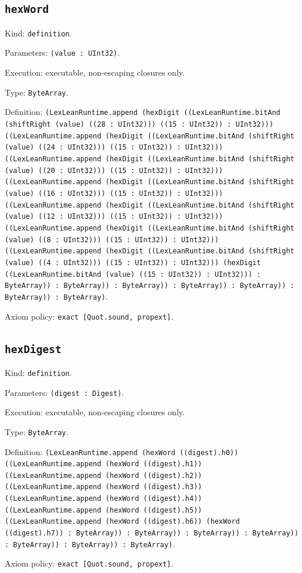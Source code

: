 \documentclass[11pt]{article}
\begin{document}
\subsection*{\texttt{hexWord}}
\noindent Kind: \texttt{definition}.\par
\noindent Parameters: \texttt{(value : UInt32)}.\par
\noindent Execution: executable, non-escaping closures only.\par
\noindent Type: \texttt{ByteArray}.\par
\noindent Definition: \texttt{(LexLeanRuntime.append (hexDigit ((LexLeanRuntime.bitAnd (shiftRight (value) ((28 : UInt32))) ((15 : UInt32)) : UInt32))) ((LexLeanRuntime.append (hexDigit ((LexLeanRuntime.bitAnd (shiftRight (value) ((24 : UInt32))) ((15 : UInt32)) : UInt32))) ((LexLeanRuntime.append (hexDigit ((LexLeanRuntime.bitAnd (shiftRight (value) ((20 : UInt32))) ((15 : UInt32)) : UInt32))) ((LexLeanRuntime.append (hexDigit ((LexLeanRuntime.bitAnd (shiftRight (value) ((16 : UInt32))) ((15 : UInt32)) : UInt32))) ((LexLeanRuntime.append (hexDigit ((LexLeanRuntime.bitAnd (shiftRight (value) ((12 : UInt32))) ((15 : UInt32)) : UInt32))) ((LexLeanRuntime.append (hexDigit ((LexLeanRuntime.bitAnd (shiftRight (value) ((8 : UInt32))) ((15 : UInt32)) : UInt32))) ((LexLeanRuntime.append (hexDigit ((LexLeanRuntime.bitAnd (shiftRight (value) ((4 : UInt32))) ((15 : UInt32)) : UInt32))) (hexDigit ((LexLeanRuntime.bitAnd (value) ((15 : UInt32)) : UInt32))) : ByteArray)) : ByteArray)) : ByteArray)) : ByteArray)) : ByteArray)) : ByteArray)) : ByteArray)}.\par
\noindent Axiom policy: \texttt{exact [Quot.sound, propext]}.\par
\subsection*{\texttt{hexDigest}}
\noindent Kind: \texttt{definition}.\par
\noindent Parameters: \texttt{(digest : Digest)}.\par
\noindent Execution: executable, non-escaping closures only.\par
\noindent Type: \texttt{ByteArray}.\par
\noindent Definition: \texttt{(LexLeanRuntime.append (hexWord ((digest).h0)) ((LexLeanRuntime.append (hexWord ((digest).h1)) ((LexLeanRuntime.append (hexWord ((digest).h2)) ((LexLeanRuntime.append (hexWord ((digest).h3)) ((LexLeanRuntime.append (hexWord ((digest).h4)) ((LexLeanRuntime.append (hexWord ((digest).h5)) ((LexLeanRuntime.append (hexWord ((digest).h6)) (hexWord ((digest).h7)) : ByteArray)) : ByteArray)) : ByteArray)) : ByteArray)) : ByteArray)) : ByteArray)) : ByteArray)}.\par
\noindent Axiom policy: \texttt{exact [Quot.sound, propext]}.\par
\end{document}
